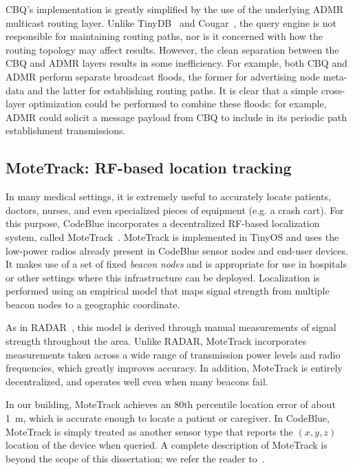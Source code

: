 CBQ's implementation is greatly simplified by the use of the
underlying ADMR multicast routing layer. Unlike TinyDB~\cite{tinydb-osdi}
and Cougar~\cite{cougar-sigmodrecord}, the query engine is not
responsible for maintaining routing paths, nor is it concerned with
how the routing topology may affect results. However, the clean
separation between the CBQ and ADMR layers results in some
inefficiency.  For example, both CBQ and ADMR perform separate
broadcast floods, the former for advertising node meta-data and the
latter for establishing routing paths. It is clear that a simple
cross-layer optimization could be performed to combine these floods:
for example, ADMR could solicit a message payload from CBQ to include
in its periodic path establishment transmissions.

\subsection{MoteTrack: RF-based location tracking}
\label{sec-cb-motetrack}


In many medical settings, it is extremely useful to accurately locate
patients, doctors, nurses, and even specialized pieces of equipment
(e.g. a crash cart). For this purpose, CodeBlue incorporates a
decentralized RF-based localization system, called
MoteTrack~\cite{motetrack-loca05}. MoteTrack is implemented in TinyOS
and uses the low-power radios already present in CodeBlue
sensor nodes and end-user devices. It makes use of a set of
fixed {\em beacon nodes} and is appropriate for use in hospitals or
other settings where this infrastructure can be deployed. Localization
is performed using an empirical model that maps signal strength from
multiple beacon nodes to a geographic coordinate.

As in RADAR~\cite{radar}, this model is derived through manual 
measurements of signal strength throughout the area. Unlike RADAR,
MoteTrack incorporates measurements taken across a wide range of 
transmission power levels and radio frequencies, which greatly improves 
accuracy. In addition, MoteTrack is entirely decentralized,
and operates well even when many beacons fail.

In our building, MoteTrack achieves an 80th percentile location error
of about 1~m, which is accurate enough to locate a patient or
caregiver. In CodeBlue, MoteTrack is simply treated as another sensor
type that reports the $(x,y,z)$ location of the device when queried. A
complete description of MoteTrack is beyond the scope of this dissertation;
we refer the reader to~\cite{motetrack-loca05}.


